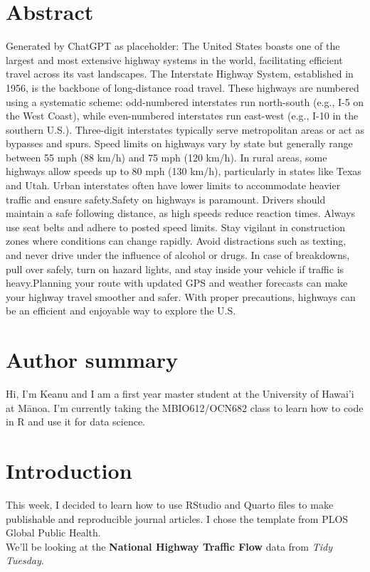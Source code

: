 \documentclass[
  10pt,
  letterpaper,
]{article}
\begin{document}
\section*{Abstract}
Generated by ChatGPT as placeholder: The United States boasts one of the
largest and most extensive highway systems in the world, facilitating
efficient travel across its vast landscapes. The Interstate Highway
System, established in 1956, is the backbone of long-distance road
travel. These highways are numbered using a systematic scheme:
odd-numbered interstates run north-south (e.g., I-5 on the West Coast),
while even-numbered interstates run east-west (e.g., I-10 in the
southern U.S.). Three-digit interstates typically serve metropolitan
areas or act as bypasses and spurs. Speed limits on highways vary by
state but generally range between 55 mph (88 km/h) and 75 mph (120
km/h). In rural areas, some highways allow speeds up to 80 mph (130
km/h), particularly in states like Texas and Utah. Urban interstates
often have lower limits to accommodate heavier traffic and ensure
safety.Safety on highways is paramount. Drivers should maintain a safe
following distance, as high speeds reduce reaction times. Always use
seat belts and adhere to posted speed limits. Stay vigilant in
construction zones where conditions can change rapidly. Avoid
distractions such as texting, and never drive under the influence of
alcohol or drugs. In case of breakdowns, pull over safely, turn on
hazard lights, and stay inside your vehicle if traffic is heavy.Planning
your route with updated GPS and weather forecasts can make your highway
travel smoother and safer. With proper precautions, highways can be an
efficient and enjoyable way to explore the U.S.

\section*{Author summary}
Hi, I'm Keanu and I am a first year master student at the University of
Hawai'i at Mānoa. I'm currently taking the MBIO612/OCN682 class to learn
how to code in R and use it for data science.

\linenumbers

\section{Introduction}\label{introduction}

This week, I decided to learn how to use RStudio and Quarto files to
make publishable and reproducible journal articles. I chose the template
from PLOS Global Public Health.\\
We'll be looking at the \textbf{National Highway Traffic Flow} data from
\emph{Tidy Tuesday}.
\end{document}
